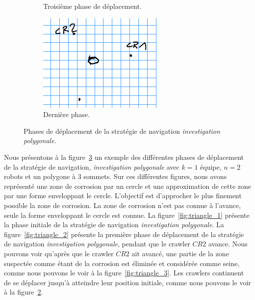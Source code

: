\documentclass[english,RandD]{rapportPFE}  %
\begin{document}
\begin{figure}[h!]
\begin{subfigure}[t]{0.3\linewidth}
						\caption{Troisième phase de déplacement.}
						\label{fig:triangle_6}
					\end{subfigure}
					\hfill
					\begin{subfigure}[t]{0.3\linewidth}
						\centering
						\includegraphics[width=\linewidth]{graphics/triangle_7.png}
						\caption{Dernière phase.}
						\label{fig:triangle_7}
					\end{subfigure}
						\caption{Phases de déplacement de la stratégie de navigation \textit{investigation polygonale}.}
						\label{fig:triangle}
				\end{figure}

				Nous présentons à la figure~\ref{fig:triangle} un exemple des différentes phases de déplacement de la stratégie de navigation, \textit{investigation polygonale} avec $k = 1$ équipe, $n = 2$ robots et un polygone à 3 sommets.
				Sur ces différentes figures, nous avons représenté une zone de corrosion par un cercle et une approximation de cette zone par une forme enveloppant le cercle.
				L'objectif est d'approcher le plus finement possible la zone de corrosion.
				La zone de corrosion n'est pas connue à l'avance, seule la forme enveloppant le cercle est connue.
				La figure~\ref{fig:triangle_1} présente la phase initiale de la stratégie de navigation \textit{investigation polygonale}.
				La figure~\ref{fig:triangle_2} présente la première phase de déplacement de la stratégie de navigation \textit{investigation polygonale}, pendant que le crawler $CR2$ avance.
				Nous pouvons voir qu'après que le crawler $CR2$ ait avancé, une partie de la zone suspectée comme étant de la corrosion est éliminée et considérée comme seine, comme nous pouvons le voir à la figure~\ref{fig:triangle_3}.
				Les crawlers continuent de se déplacer jusqu'à atteindre leur position initiale, comme nous pouvons le voir à la figure~\ref{fig:triangle_7}.
\end{document}
